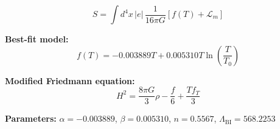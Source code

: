 
\begin{equation}
  S = \int d^4x \, |e| \, \frac{1}{16\pi G} \left[ f(T) + \mathcal{L}_m \right]
\end{equation}

\textbf{Best-fit model:}
\begin{equation}
  f(T) = -0.003889 T + 0.005310 T \ln\!\left(\frac{T}{T_0}\right)
\end{equation}

\textbf{Modified Friedmann equation:}
\begin{equation}
  H^2 = \frac{8\pi G}{3} \rho - \frac{f}{6} + \frac{T f_T}{3}
\end{equation}

\textbf{Parameters:}
$\alpha = -0.003889$, \quad
$\beta = 0.005310$, \quad
$n = 0.5567$, \quad
$\Lambda_{\text{BI}} = 568.2253$